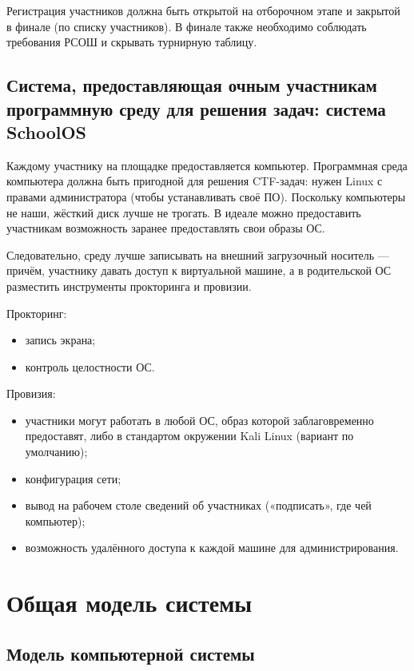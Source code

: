 Регистрация участников должна быть открытой на отборочном этапе и закрытой в финале (по списку участников). В финале также необходимо соблюдать требования РСОШ и скрывать турнирную таблицу.


\subsection{Система, предоставляющая очным участникам программную среду для решения задач: система SchoolOS}

Каждому участнику на площадке предоставляется компьютер. Программная среда компьютера должна быть пригодной для решения CTF-задач: нужен Linux с правами администратора (чтобы устанавливать своё ПО). Поскольку компьютеры не наши, жёсткий диск лучше не трогать. В идеале можно предоставить участникам возможность заранее предоставлять свои образы ОС.

Следовательно, среду лучше записывать на внешний загрузочный носитель — причём, участнику давать доступ к виртуальной машине, а в родительской ОС разместить инструменты прокторинга и провизии.

Прокторинг:
\begin{itemize}
\item
  запись экрана;
\item
  контроль целостности ОС.
\end{itemize}

Провизия:
\begin{itemize}
\item
  участники могут работать в любой ОС, образ которой заблаговременно предоставят, либо в стандартом окружении Kali Linux (вариант по умолчанию);
\item
  конфигурация сети;
\item
  вывод на рабочем столе сведений об участниках («подписать», где чей компьютер);
\item
  возможность удалённого доступа к каждой машине для администрирования.
\end{itemize}


\section{Общая модель системы}

\subsection{Модель компьютерной системы}

